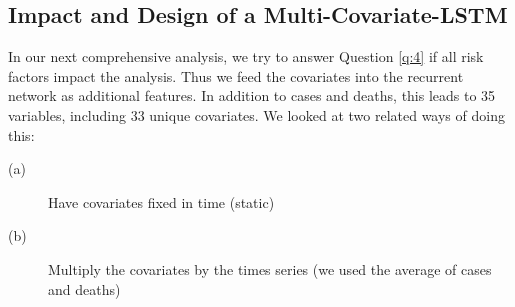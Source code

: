 \documentclass[12pt]{article}
\theoremstyle{definition}
\renewcommand{\_}{%
    \textunderscore\hspace{0pt}%
}
\begin{document}

\subsection{Impact and Design of a Multi-Covariate-LSTM}
\label{sec:lstm-many}

In our next comprehensive analysis, we try to answer Question \ref{q:4} if all risk factors impact the analysis. Thus we feed the covariates into the recurrent network as additional features. In addition to cases and deaths, this leads to 35 variables, including 33 unique covariates. We looked at two related ways of doing this:

\begin{description}

\item [(a)] Have covariates fixed in time (static)

\item[(b)] Multiply the covariates by the times series (we used the average of cases and deaths)

\end{description}
\end{document}
